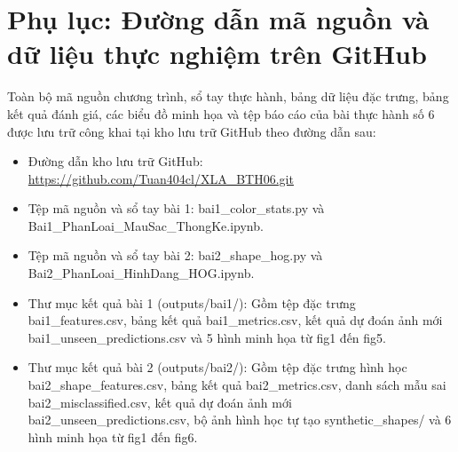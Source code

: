 \documentclass[12pt,a4paper]{article}
\begin{document}
\section{Phụ lục: Đường dẫn mã nguồn và dữ liệu thực nghiệm trên GitHub}
Toàn bộ mã nguồn chương trình, sổ tay thực hành, bảng dữ liệu đặc trưng, bảng kết quả đánh giá, các biểu đồ minh họa và tệp báo cáo của bài thực hành số 6 được lưu trữ công khai tại kho lưu trữ GitHub theo đường dẫn sau:
\begin{itemize}
    \item Đường dẫn kho lưu trữ GitHub: \href{https://github.com/Tuan404cl/XLA_BTH06.git}{https://github.com/Tuan404cl/XLA\_BTH06.git}
    \item Tệp mã nguồn và sổ tay bài 1: bai1\_color\_stats.py và Bai1\_PhanLoai\_MauSac\_ThongKe.ipynb.
    \item Tệp mã nguồn và sổ tay bài 2: bai2\_shape\_hog.py và Bai2\_PhanLoai\_HinhDang\_HOG.ipynb.
    \item Thư mục kết quả bài 1 (outputs/bai1/): Gồm tệp đặc trưng bai1\_features.csv, bảng kết quả bai1\_metrics.csv, kết quả dự đoán ảnh mới bai1\_unseen\_predictions.csv và 5 hình minh họa từ fig1 đến fig5.
    \item Thư mục kết quả bài 2 (outputs/bai2/): Gồm tệp đặc trưng hình học bai2\_shape\_features.csv, bảng kết quả bai2\_metrics.csv, danh sách mẫu sai bai2\_misclassified.csv, kết quả dự đoán ảnh mới bai2\_unseen\_predictions.csv, bộ ảnh hình học tự tạo synthetic\_shapes/ và 6 hình minh họa từ fig1 đến fig6.
\end{itemize}
\end{document}
